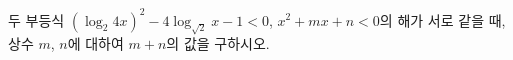 두 부등식 $(\log_2 4x)^2-4\log_{\sqrt{2}} x-1<0$, $x^2+mx+n<0$의 해가 서로 같을 때, 상수 $m$, $n$에 대하여 $m+n$의 값을 구하시오.

